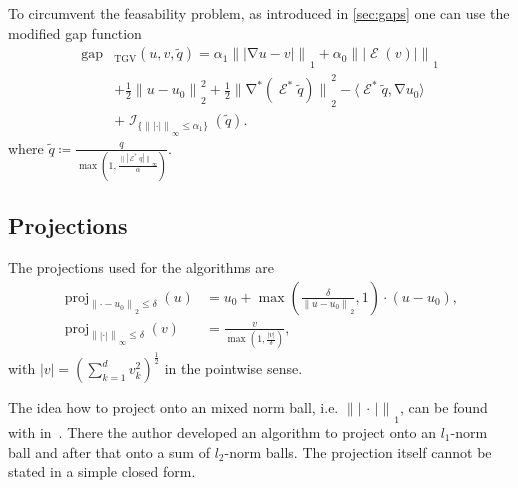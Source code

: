 \documentclass[twocolumn,envcountsame]{svjour3}
\newcommand{\norm}[2][]{{\|{#2}\|_{}}_{#1}}
\newcommand{\abs}[1]{|#1|}
\newcommand{\dummy}{\,\cdot\,}
\DeclareMathOperator{\ind}{\mathcal{I}}
\DeclareMathOperator{\proj}{proj}
\DeclareMathOperator{\gap}{gap}
\DeclareMathOperator{\grad}{\nabla}
\DeclareMathOperator{\symgrad}{\mathcal{E}}
\DeclareMathOperator{\TGV}{TGV}
\begin{document}
	      To circumvent the feasability problem, as introduced in  \ref{sec:gaps} one can use the modified
     gap function
	      \begin{align*}
     \gap&_{\TGV}(u,v,\tilde q)=\alpha_1\norm[1]{\abs{\grad u - v}} + 
		\alpha_0\norm[1]{\abs{\symgrad(v)}}\\
		&+\frac{1}{2}\norm[2]{u-u_0}^2
		+\frac{1}{2}\norm[2]{\grad^* (\symgrad^*\tilde q)}^2 - \langle \symgrad^*\tilde q, \grad
		u_0\rangle\\ 
		&+ \ind_{\{\norm[\infty]{\abs{\cdot}}\leq\alpha_1\}}(\tilde q).
	      \end{align*}
		where $\tilde
		q\coloneqq\frac{q}{\max\left(1,\frac{\norm[\infty]{\abs{\symgrad^*q}}}{\alpha}\right)}$.

\subsection{Projections}
The projections used for the algorithms are
   \begin{align*}
     \proj_{\norm[2]{\cdot-u_0}\leq \delta}(u)&=u_0 +
     \max\left(\frac{\delta}{\norm[2]{u-u_0}},1\right)\cdot(u-u_0),\\
     \proj_{\norm[\infty]{\abs{\cdot}}\leq\delta}(v)&=\frac{v}{\max(1,\frac{\abs{v}}{\delta})},
   \end{align*}
   with $\abs{v}=\left(\sum_{k=1}^dv_k^2\right)^{\frac{1}{2}}$ in the pointwise sense.
   
The idea how to project onto an mixed norm ball, i.e. $\norm[1]{\abs{\dummy}}$, can be found with in~\cite{Songsiri2011}. There the author developed an algorithm to project onto an $l_1$-norm ball and after that onto a sum of $l_2$-norm balls. The projection itself cannot be stated in a simple closed form. 
\end{document}
